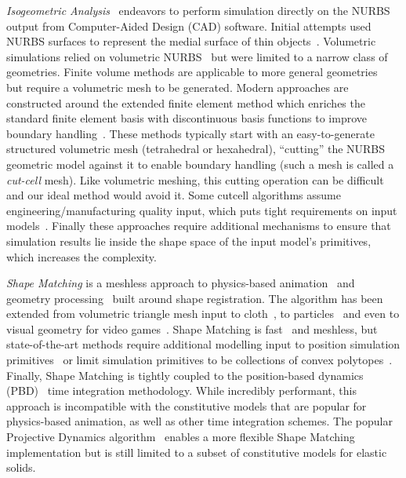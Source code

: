 \emph{Isogeometric Analysis}~\cite{10.1002/9780470749081.ch7} endeavors to perform simulation directly on the NURBS output from 
Computer-Aided Design (CAD) software. Initial attempts used NURBS surfaces to represent the medial surface of thin objects~\cite{10.1145/176579.176580}.
Volumetric simulations relied on volumetric NURBS~\cite{10.1007/978-3-642-03596-8_2} but were limited to a narrow class of geometries.
Finite volume methods are applicable to more general geometries~\cite{HEINRICH20121645,10.1002/nme.2311} but require a volumetric mesh to be generated.
Modern approaches are constructed around the extended finite element method which enriches the standard finite element basis with discontinuous basis functions
to improve boundary handling~\cite{https://doi.org/10.1002/nme.3120,10.1007/s00466-013-0854-7,https://doi.org/10.1002/nme.4852,SAFDARI2016373,10.1145/3355089.3356576}. 
These methods typically start with an easy-to-generate structured volumetric mesh (tetrahedral or hexahedral), ``cutting'' the NURBS geometric model against
it to enable boundary handling (such a mesh is called a \emph{cut-cell} mesh). 
Like volumetric meshing, this cutting operation can be difficult and our ideal method would avoid it. 
Some cutcell algorithms assume engineering/manufacturing quality input, which puts tight requirements on input models~\cite{10.1145/3355089.3356576}.
Finally these approaches require additional mechanisms to ensure that simulation results lie inside the shape space of the input model's primitives,
which increases the complexity. 

\emph{Shape Matching} is a meshless approach to physics-based animation~\cite{10.1145/1073204.1073216,10.1145/2019406.2019438} and geometry processing~\cite{10.1111/j.1467-8659.2012.03171.x}
built around shape registration. The algorithm has been extended from volumetric triangle mesh input to cloth~\cite{10.2312/PE/vriphys/vriphys08/039-046}, to particles~\cite{10.1145/1964921.1964987}
and even to visual geometry for video games~\cite{10.1145/2994258.2994260}. 
Shape Matching is fast~\cite{10.1145/1275808.1276480,10.5555/1632592.1632606} and meshless, but state-of-the-art methods require 
additional modelling input to position simulation primitives~\cite{10.1145/1964921.1964987} or limit simulation primitives to be 
collections of convex polytopes~\cite{10.1145/2994258.2994260}.
Finally, Shape Matching is tightly coupled to the position-based dynamics (PBD)~\cite{muller2007position}
time integration methodology. 
While incredibly performant, this approach is incompatible with the constitutive models that are popular for physics-based animation, as well as 
other time integration schemes. 
The popular Projective Dynamics algorithm~\cite{10.1145/2601097.2601116} enables a more flexible Shape Matching implementation but is still limited to a subset of
constitutive models for elastic solids. 


